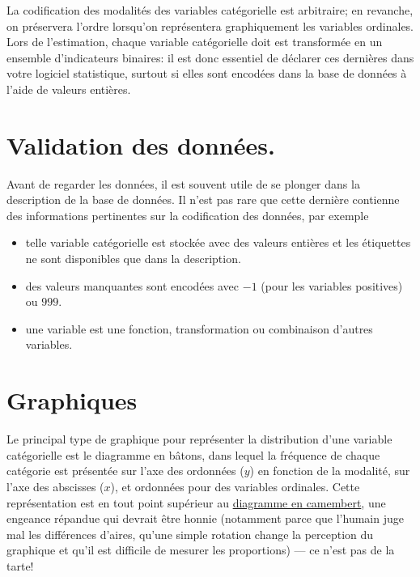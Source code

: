\documentclass[
  11pt,
  letterpaper,
]{scrbook}
\providecommand{\tightlist}{%
  \setlength{\itemsep}{0pt}\setlength{\parskip}{0pt}}\usepackage{longtable,booktabs,array}
\theoremstyle{definition}
\theoremstyle{remark}
\begin{document}
La codification des modalités des variables catégorielle est arbitraire;
en revanche, on préservera l'ordre lorsqu'on représentera graphiquement
les variables ordinales. Lors de l'estimation, chaque variable
catégorielle doit est transformée en un ensemble d'indicateurs binaires:
il est donc essentiel de déclarer ces dernières dans votre logiciel
statistique, surtout si elles sont encodées dans la base de données à
l'aide de valeurs entières.

\section{Validation des données.}\label{validation-des-donnuxe9es.}

Avant de regarder les données, il est souvent utile de se plonger dans
la description de la base de données. Il n'est pas rare que cette
dernière contienne des informations pertinentes sur la codification des
données, par exemple

\begin{itemize}
\tightlist
\item
  telle variable catégorielle est stockée avec des valeurs entières et
  les étiquettes ne sont disponibles que dans la description.
\item
  des valeurs manquantes sont encodées avec \(-1\) (pour les variables
  positives) ou \(999\).
\item
  une variable est une fonction, transformation ou combinaison d'autres
  variables.
\end{itemize}

\section{Graphiques}\label{graphiques}

Le principal type de graphique pour représenter la distribution d'une
variable catégorielle est le diagramme en bâtons, dans lequel la
fréquence de chaque catégorie est présentée sur l'axe des ordonnées
(\(y\)) en fonction de la modalité, sur l'axe des abscisses (\(x\)), et
ordonnées pour des variables ordinales. Cette représentation est en tout
point supérieur au
\href{http://www.perceptualedge.com/articles/08-21-07.pdf}{diagramme en
camembert}, une engeance répandue qui devrait être honnie (notamment
parce que l'humain juge mal les différences d'aires, qu'une simple
rotation change la perception du graphique et qu'il est difficile de
mesurer les proportions) --- ce n'est pas de la tarte!
\end{document}
